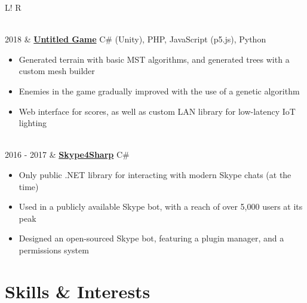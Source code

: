 \documentclass[10pt, a4paper]{article}
\newcommand\vsep{\color{lightgray} \vrule width 0.5pt}
\newcommand\sect[1]{\section*{\Large\sc #1}}
\newcommand\itemizespace{\vspace{-0.65\baselineskip}}
\begin{document}
\begin{tabular}{L!{\vsep}R}
\begin{itemize}[label=\raisebox{0.25ex}{\tiny$\bullet$}]
                    \end{itemize} \\
                2018 & \href{https://github.com/lin-e/CSProject2017}{\textbf{Untitled Game}} \hfill C\# (Unity), PHP, JavaScript (p5.js), Python
                    \begin{itemize}[label=\raisebox{0.25ex}{\tiny$\bullet$}]
                        \setlength{\itemindent}{-0.1in}
                        \item Generated terrain with basic MST algorithms, and generated trees with a custom mesh builder
                        \item Enemies in the game gradually improved with the use of a genetic algorithm
                        \item Web interface for scores, as well as custom LAN library for low-latency IoT lighting
                        \itemizespace
                    \end{itemize} \\
                2016 - 2017 & \href{https://github.com/lin-e/Skype4Sharp}{\textbf{Skype4Sharp}} \hfill C\#
                    \begin{itemize}[label=\raisebox{0.25ex}{\tiny$\bullet$}]
                        \setlength{\itemindent}{-0.1in}
                        \item Only public .NET library for interacting with modern Skype chats (at the time)
                        \item Used in a publicly available Skype bot, with a reach of over 5,000 users at its peak
                        \item Designed an open-sourced Skype bot, featuring a plugin manager, and a permissions system
                        \vspace{-1.1\baselineskip}
                    \end{itemize}
            \end{tabular}
        \sect{Skills \& Interests}
\end{document}
